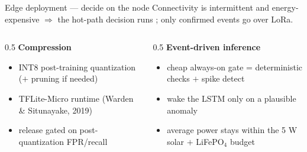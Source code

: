 \documentclass[aspectratio=169,11pt]{beamer}
\begin{document}
\begin{frame}{Edge deployment — decide on the node}
  Connectivity is intermittent and energy-expensive $\Rightarrow$ the hot-path
  decision runs ; only confirmed events go over LoRa.
  \begin{columns}[T]
    \begin{column}{0.5\textwidth}
      \textbf{Compression}
      \begin{itemize}\small
        \item INT8 post-training quantization ($+$ pruning if needed)
        \item TFLite-Micro runtime (Warden \& Situnayake, 2019)
        \item release \alert{gated} on post-quantization FPR/recall
      \end{itemize}
    \end{column}
    \begin{column}{0.5\textwidth}
      \textbf{Event-driven inference}
      \begin{itemize}\small
        \item cheap always-on gate = deterministic checks $+$ spike detect
        \item wake the LSTM only on a plausible anomaly
        \item average power stays within the 5 W solar $+$ LiFePO$_4$ budget
      \end{itemize}
    \end{column}
  \end{columns}
\end{frame}
\end{document}
